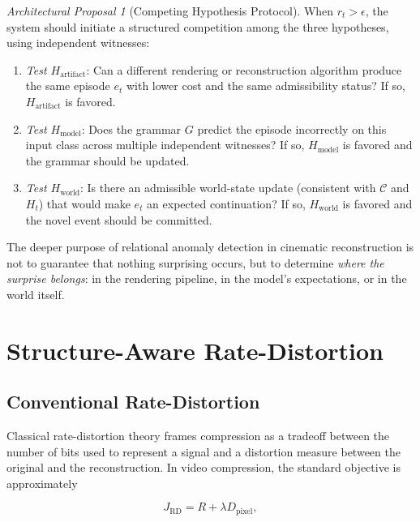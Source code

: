\documentclass[11pt,a4paper]{article}
\theoremstyle{plain}
\theoremstyle{definition}
\theoremstyle{remark}
\newtheorem{proposal}[theorem]{Architectural Proposal}
\begin{document}
\begin{proposal}[Competing Hypothesis Protocol]
When $r_t > \epsilon$, the system should initiate a structured competition among the three hypotheses, using independent witnesses:
\begin{enumerate}[leftmargin=2em,itemsep=0pt]
\item \textit{Test $H_{\mathrm{artifact}}$}: Can a different rendering or reconstruction algorithm produce the same episode $e_t$ with lower cost and the same admissibility status? If so, $H_{\mathrm{artifact}}$ is favored.
\item \textit{Test $H_{\mathrm{model}}$}: Does the grammar $G$ predict the episode incorrectly on this input class across multiple independent witnesses? If so, $H_{\mathrm{model}}$ is favored and the grammar should be updated.
\item \textit{Test $H_{\mathrm{world}}$}: Is there an admissible world-state update (consistent with $\mathcal{C}$ and $H_t$) that would make $e_t$ an expected continuation? If so, $H_{\mathrm{world}}$ is favored and the novel event should be committed.
\end{enumerate}
\end{proposal}

The deeper purpose of relational anomaly detection in cinematic reconstruction is not to guarantee that nothing surprising occurs, but to determine \textit{where the surprise belongs}: in the rendering pipeline, in the model's expectations, or in the world itself.


\section{Structure-Aware Rate-Distortion}
\label{sec:ratedistortion}

\subsection{Conventional Rate-Distortion}

Classical rate-distortion theory \cite{berger1971,coverandthomas2006} frames compression as a tradeoff between the number of bits used to represent a signal and a distortion measure between the original and the reconstruction. In video compression, the standard objective is approximately

\[
J_{\mathrm{RD}} = R + \lambda D_{\mathrm{pixel}},
\]
\end{document}
